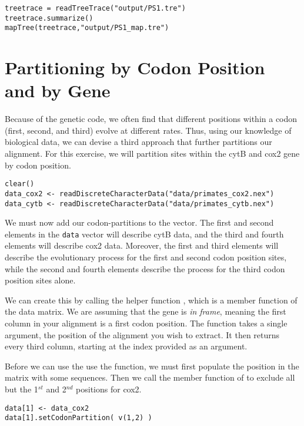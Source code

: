 {\tt \begin{snugshade*}
\begin{lstlisting}
treetrace = readTreeTrace("output/PS1.tre")
treetrace.summarize()
mapTree(treetrace,"output/PS1_map.tre")
\end{lstlisting}
\end{snugshade*}}



\section{Partitioning by Codon Position and by Gene}\label{secExtremeP}

Because of the genetic code, we often find that different positions within a codon (first, second, and third) evolve at different rates.
Thus, using our knowledge of biological data, we can devise a third approach that further partitions our alignment. 
For this exercise, we will partition sites within the cytB and cox2 gene by codon position.

{\tt \begin{snugshade*}
\begin{lstlisting}
clear()
data_cox2 <- readDiscreteCharacterData("data/primates_cox2.nex")
data_cytb <- readDiscreteCharacterData("data/primates_cytb.nex")
\end{lstlisting}
\end{snugshade*}}

We must now add our codon-partitions to the  vector.
The first and second elements in the {\tt data} vector will describe cytB data, and the third and fourth elements will describe cox2 data.
Moreover, the first and third elements will describe the evolutionary process for the first and second codon position sites, while the second and fourth elements describe the process for the third codon position sites alone.

We can create this by calling the helper function , which is a member function of the data matrix. 
We are assuming that the gene is \textit{in frame}, meaning the first column in your alignment is a first codon position. 
The  function takes a single argument, the position of the alignment you wish to extract. 
It then returns every third column, starting at the index provided as an argument.

Before we can use the use the  function, we must first populate the position in the  matrix with some sequences. 
Then we call the member function of  to exclude all but the 1$^{st}$ and 2$^{nd}$ positions for cox2.
{\tt \begin{snugshade*}
\begin{lstlisting}
data[1] <- data_cox2
data[1].setCodonPartition( v(1,2) )
\end{lstlisting}
\end{snugshade*}}

